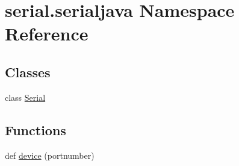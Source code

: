 \hypertarget{namespaceserial_1_1serialjava}{}\section{serial.\+serialjava Namespace Reference}
\label{namespaceserial_1_1serialjava}
\subsection*{Classes}
\begin{DoxyCompactItemize}
\item 
class \hyperlink{classserial_1_1serialjava_1_1_serial}{Serial}
\end{DoxyCompactItemize}
\subsection*{Functions}
\begin{DoxyCompactItemize}
\item 
def \hyperlink{namespaceserial_1_1serialjava_a79cbc21c1fea1be7c00779ae141f2ade}{device} (portnumber)
\end{DoxyCompactItemize}
